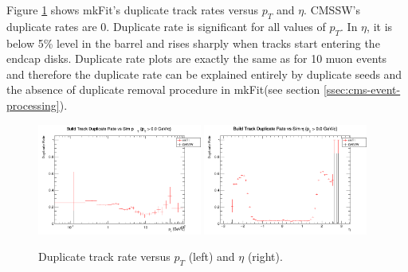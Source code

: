 \documentclass{webofc}
\def\mkfit{mkFit\xspace}
\def\twop{0.48\textwidth}
\def\postfigskip{\vskip-4mm}
\begin{document}
Figure \ref{fig:drates} shows \mkfit's duplicate track rates versus $p_T$ and
$\eta$. CMSSW's duplicate rates are 0. Duplicate rate is significant for all
values of $p_T$. In $\eta$, it is below 5\% level in the barrel and rises
sharply when tracks start entering the endcap disks. Duplicate rate plots are
exactly the same as for 10 muon events and therefore the duplicate rate can be
explained entirely by duplicate seeds and the absence of duplicate removal
procedure in \mkfit (see section \ref{ssec:cms-event-processing}).

\begin{figure}[thb]
  \centering
  \includegraphics[width=\twop]{figs/phys/SKL-SP_CMSSW_TTbar_PU70_dr_pt_logx_build_pt0p0_SIMVAL.png}
  \hfill
  \includegraphics[width=\twop]{figs/phys/SKL-SP_CMSSW_TTbar_PU70_dr_eta_build_pt0p0_SIMVAL.png}
  \postfigskip

  \caption{Duplicate track rate versus $p_T$ (left) and $\eta$ (right).}
  \label{fig:drates}
\end{figure}
\end{document}
